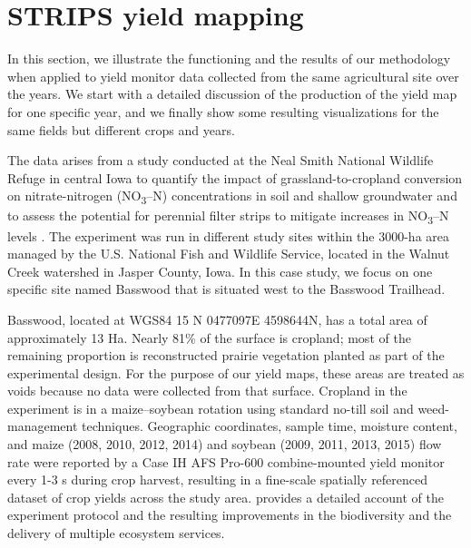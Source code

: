 \chapter{STRIPS yield mapping}

 In this section, we illustrate the
functioning and the results of our methodology when applied to yield
monitor data collected from the same agricultural site over the
years. We start with a detailed discussion of the production of the
yield map for one specific year, and we finally show some resulting
visualizations for the same fields but different crops and years.

 The data arises from a study
conducted at the Neal Smith National Wildlife Refuge in central Iowa
to quantify the impact of grassland-to-cropland conversion on
nitrate-nitrogen (NO\textsubscript{3}–N) concentrations in soil and
shallow groundwater and to assess the potential for perennial filter
strips to mitigate increases in NO\textsubscript{3}–N levels
\citep{Zhou2010}. The experiment was run in different study sites
within the 3000-ha area managed by the U.S. National Fish and Wildlife
Service, located in the Walnut Creek watershed in Jasper County,
Iowa. In this case study, we focus on one specific site named Basswood
that is situated west to the Basswood Trailhead.

 Basswood, located at WGS84 15 N
0477097E 4598644N, has a total area of approximately 13 Ha. Nearly
81\% of the surface is cropland; most of the remaining proportion is
reconstructed prairie vegetation planted as part of the experimental
design. For the purpose of our yield maps, these areas are treated as
voids because no data were collected from that surface. Cropland in the
experiment is in a maize–soybean rotation using standard no-till soil
and weed-management techniques. Geographic coordinates, sample time,
moisture content, and maize (2008, 2010, 2012, 2014) and soybean (2009,
2011, 2013, 2015) flow rate were reported by a Case IH AFS Pro-600
combine-mounted yield monitor every 1-3 s during crop harvest,
resulting in a fine-scale spatially referenced dataset of crop yields
across the study area. \cite{Schulte2017} provides a detailed account
of the experiment protocol and the resulting improvements in the
biodiversity and the delivery of multiple ecosystem services.

